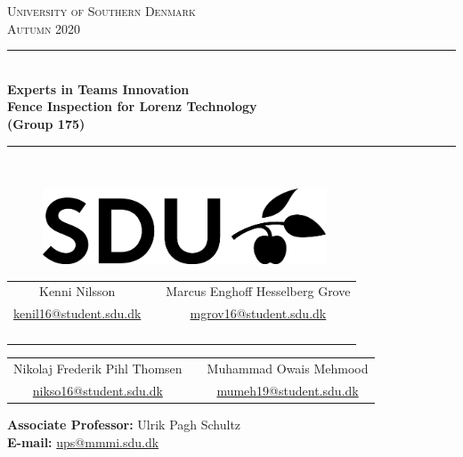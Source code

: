 \documentclass[main.tex]{subfiles}
\begin{document}
\begin{titlepage}
\begin{center}
\textsc{\LARGE University of Southern Denmark}\\[1.5cm]


\textsc{\large  Autumn 2020}\\[0.5cm]
\rule{\linewidth}{0.5mm}\\[0.2cm]
{ \LARGE \bfseries Experts in Teams Innovation \\[0.4cm]}
{ \Large \bfseries Fence Inspection for Lorenz Technology \\ [0.2cm]}
{ \Large \bfseries (Group 175) \\ [0.2cm]}
\rule{\linewidth}{0.5mm}\\[1.2cm]

\vspace{0.25cm}

    \begin{figure}[h!]
    \centering
    \includegraphics[width=0.75\textwidth]{../Figures/SDUlogo.png}
    \label{fig:SDUlogo}\\
    [1.5cm]
    \end{figure}


\begin{tabular}{c c c}
	\cline{1-1}\cline{3-3}
	\\
    Kenni Nilsson & & Marcus Enghoff Hesselberg Grove \\
    \href{mailto:kenil16@student.sdu.dk}{kenil16@student.sdu.dk} & & \href{mailto:mgrov16@student.sdu.dk}{mgrov16@student.sdu.dk}\\
    \\ \\ \\ \\
\end{tabular}	
\begin{tabular}{c c c}
	\cline{1-1}\cline{3-3}
	\\
    Nikolaj Frederik Pihl Thomsen & & Muhammad Owais Mehmood\\
    \href{mailto:nikso16@student.sdu.dk}{nikso16@student.sdu.dk} & &
    \href{mailto:mumeh19@student.sdu.dk} {mumeh19@student.sdu.dk}
\end{tabular}	

\vfill

\textbf{Associate Professor:} Ulrik Pagh Schultz\\
\textbf{E-mail:} \href{mailto:skjo@iti.sdu.dk}{ups@mmmi.sdu.dk} \\ 
\mbox{}\\
\end{center}
\end{titlepage}
\end{document}
